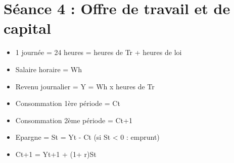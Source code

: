 \section{Séance 4 : Offre de travail et de capital}


\begin{itemize}
	\item 1 journée = 24 heures = heures de Tr + heures de loi
	\item Salaire horaire = Wh
	\item Revenu journalier = Y = Wh x heures de Tr
\end{itemize}
\begin{itemize}
	\item Consommation 1ère période = Ct
	\item Consommation 2ème période = Ct+1
	\item Epargne = St = Yt - Ct (si St < 0 : emprunt)
	\item Ct+1 = Yt+1 + (1+ r)St 
\end{itemize}